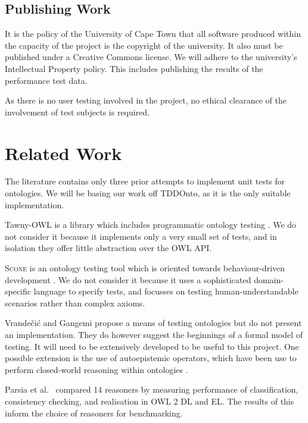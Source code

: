 \documentclass[draft]{sig-alternate}
\begin{document}
\subsection{Publishing Work}

It is the policy of the University of Cape Town that all software produced within the capacity of the project is the copyright of the university. It also must be published under a Creative Commons license. We will adhere to the university's Intellectual Property policy. This includes publishing the results of the performance test data.

As there is no user testing involved in the project, no ethical clearance of the involvement of test subjects is required.

\section{Related Work}

The literature contains only three prior attempts to implement unit tests for ontologies.  We will be basing our work off TDDOnto, as it is the only suitable implementation.

Tawny-OWL is a library which includes programmatic ontology testing \cite{DBLP:journals/corr/WarrenderL15}.  We do not consider it because it implements only a very small set of tests, and in isolation they offer little abstraction over the OWL API.

\textsc{Scone} is an ontology testing tool which is oriented towards behaviour-driven development \cite{SconeUserGuide}.  We do not consider it because it uses a sophisticated domain-specific language to specify tests, and focusses on testing human-understandable scenarios rather than complex axioms.

Vrande\v{c}i\'c and Gangemi \cite{DBLP:conf/otm/VrandecicG06} propose a means of testing ontologies but do not present an implementation.  They do however suggest the beginnings of a formal model of testing.  It will need to be extensively developed to be useful to this project.  One possible extension is the use of autoepistemic operators, which have been use to perform closed-world reasoning within ontologies \cite{DBLP:conf/owled/GrimmM05}.

Parsia et al.\ \cite{DBLP:conf/semweb/ParsiaMGGS15} compared 14 reasoners by measuring performance of classification, consistency checking, and realisation in OWL 2 DL and EL.  The results of this inform the choice of reasoners for benchmarking.
\end{document}
